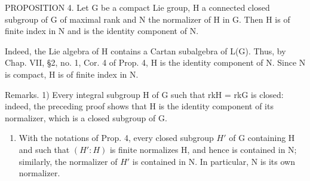 PROPOSITION 4. Let G be a compact Lie group, H a connected closed subgroup of G of maximal rank and N the normalizer of H in G. Then H is of finite index in N and is the identity component of N.

Indeed, the Lie algebra of H contains a Cartan subalgebra of L(G). Thus, by Chap. VII, §2, no. 1, Cor. 4 of Prop. 4, H is the identity component of N. Since N is compact, H is of finite index in N.

Remarks. 1) Every integral subgroup H of G such that rkH = rkG is closed: indeed, the preceding proof shows that H is the identity component of its normalizer, which is a closed subgroup of G.

\begin{enumerate}
\def\labelenumi{\arabic{enumi})}
\setcounter{enumi}{1}
\tightlist
\item
  With the notations of Prop. 4, every closed subgroup \(H'\) of G containing H and such that \((H':H)\) is finite normalizes H, and hence is contained in N; similarly, the normalizer of \(H'\) is contained in N. In particular, N is its own normalizer.
\end{enumerate}

